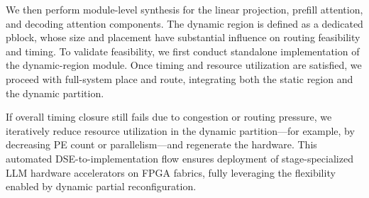 \documentclass[9pt,sigconf]{acmart}
\begin{document}
We then perform module-level synthesis for the linear projection, prefill attention, and decoding attention components. The dynamic region is defined as a dedicated pblock, whose size and placement have substantial influence on routing feasibility and timing. To validate feasibility, we first conduct standalone implementation of the dynamic-region module. Once timing and resource utilization are satisfied, we proceed with full-system place and route, integrating both the static region and the dynamic partition.

If overall timing closure still fails due to congestion or routing pressure, we iteratively reduce resource utilization in the dynamic partition---for example, by decreasing PE count or parallelism---and regenerate the hardware. This automated DSE-to-implementation flow ensures deployment of stage-specialized LLM hardware accelerators on FPGA fabrics, fully leveraging the flexibility enabled by dynamic partial reconfiguration.




\end{document}
